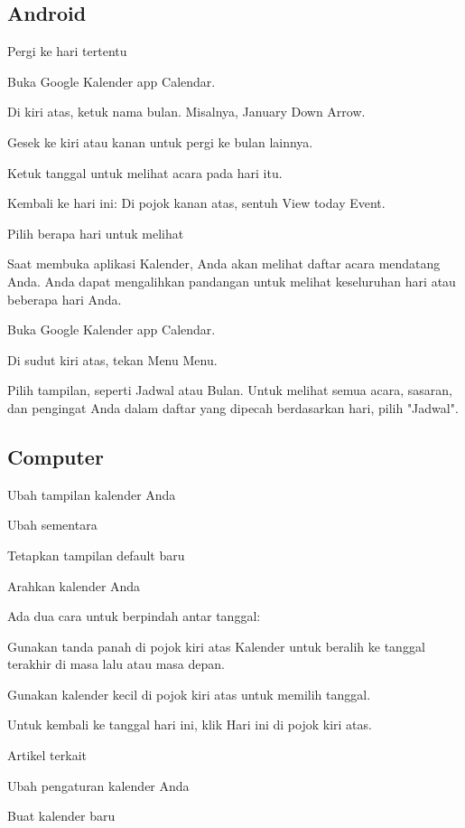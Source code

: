  \subsection {Android}
 \vspace{\baselineskip}
\noindent 
Pergi ke hari tertentu \par
\noindent 
Buka Google Kalender app Calendar. \par
\noindent 
Di kiri atas, ketuk nama bulan. Misalnya, January Down Arrow. \par
\noindent 
Gesek ke kiri atau kanan untuk pergi ke bulan lainnya. \par
\noindent 
Ketuk tanggal untuk melihat acara pada hari itu. \par
\noindent 
Kembali ke hari ini: Di pojok kanan atas, sentuh View today Event. \par
\vspace{12pt}
\noindent 
Pilih berapa hari untuk melihat \par
\noindent 
Saat membuka aplikasi Kalender, Anda akan melihat daftar acara mendatang Anda. Anda dapat mengalihkan pandangan untuk melihat keseluruhan hari atau beberapa hari Anda. \par
\vspace{12pt}
\noindent 
Buka Google Kalender app Calendar. \par
\noindent 
Di sudut kiri atas, tekan Menu Menu. \par
\noindent 
Pilih tampilan, seperti Jadwal atau Bulan. Untuk melihat semua acara, sasaran, dan pengingat Anda dalam daftar yang dipecah berdasarkan hari, pilih "Jadwal". \par
\noindent 

 \subsection {Computer}
\noindent 
Ubah tampilan kalender Anda \par
\noindent 
Ubah sementara \par
\noindent 
Tetapkan tampilan default baru \par
\noindent 
Arahkan kalender Anda \par
\noindent 
Ada dua cara untuk berpindah antar tanggal: \par
\vspace{12pt}
\noindent 
Gunakan tanda panah di pojok kiri atas Kalender untuk beralih ke tanggal terakhir di masa lalu atau masa depan. \par
\noindent 
Gunakan kalender kecil di pojok kiri atas untuk memilih tanggal. \par
\noindent 
Untuk kembali ke tanggal hari ini, klik Hari ini di pojok kiri atas. \par
\vspace{12pt}
\noindent 
Artikel terkait \par
\noindent 
Ubah pengaturan kalender Anda \par
\noindent 
Buat kalender baru \par


